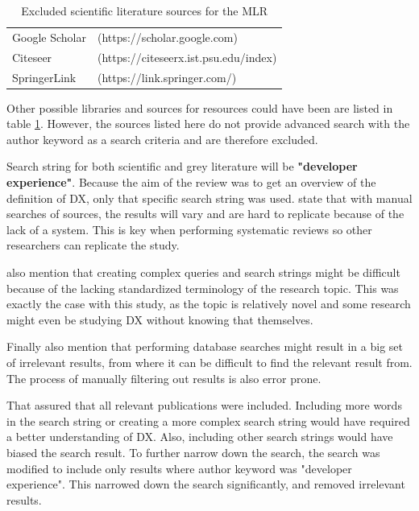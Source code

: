 \documentclass[english, 12pt, a4paper, sci, utf8, a-1b, online]{aaltothesis}
\begin{document}
\begin{table}
  \centering
  \begin{tabular}{ l l }
    \hline
    Google Scholar & (https://scholar.google.com)          \\
    Citeseer       & (https://citeseerx.ist.psu.edu/index) \\
    SpringerLink   & (https://link.springer.com/)          \\
    \hline
  \end{tabular}
  \caption{Excluded scientific literature sources for the MLR}
  \label{table:excluded-sources}
\end{table}

Other possible libraries and sources for resources could have been are listed in table \ref{table:excluded-sources}. However, the sources listed here do not provide advanced search with the author keyword as a search criteria and are therefore excluded.

Search string for both scientific and grey literature will be \textbf{"developer experience"}. Because the aim of the review was to get an overview of the definition of DX, only that specific search string was used. \cite{guidelines-for-snowballing} state that with manual searches of sources, the results will vary and are hard to replicate because of the lack of a system. This is key when performing systematic reviews so other researchers can replicate the study.

\cite{guidelines-for-snowballing} also mention that creating complex queries and search strings might be difficult because of the lacking standardized terminology of the research topic. This was exactly the case with this study, as the topic is relatively novel and some research might even be studying DX without knowing that themselves.

Finally \cite{guidelines-for-snowballing} also mention that performing database searches might result in a big set of irrelevant results, from where it can be difficult to find the relevant result from. The process of manually filtering out results is also error prone.

That assured that all relevant publications were included. Including more words in the search string or creating a more complex search string would have required a better understanding of DX. Also, including other search strings would have biased the search result. To further narrow down the search, the search was modified to include only results where author keyword was "developer experience". This narrowed down the search significantly, and removed irrelevant results.
\end{document}
